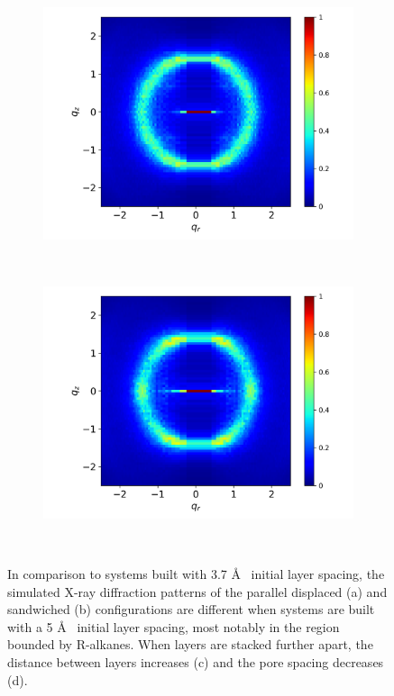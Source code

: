 \documentclass{article}
\begin{document}
\begin{figure}[!hbt]
\begin{subfigure}{0.45\linewidth}
                \caption{}~\label{fig:p2p_disordered}
        \end{subfigure}
        \begin{subfigure}{0.45\linewidth}
                \centering
                \includegraphics[width=\linewidth]{offset_disordered_rzplot.png}
                \caption{}~\label{fig:offset_disordered_xrd}
        \end{subfigure}%
        \begin{subfigure}{0.45\linewidth}
                \centering
                \includegraphics[width=\linewidth]{layered_disordered_rzplot.png}
                \caption{}~\label{fig:layered_disordered_xrd}
        \end{subfigure}
	\caption{In comparison to systems built with 3.7 \AA~ initial layer spacing,  
                the simulated X-ray diffraction patterns of the parallel displaced (a) and 
 		sandwiched (b) configurations are different when systems are built with 
 		a 5 \AA~ initial layer spacing, most notably in the region bounded by R-alkanes.
      		When layers are stacked further apart, the distance between layers increases (c)
                and the pore spacing decreases (d).}
  \end{figure}
\end{document}

